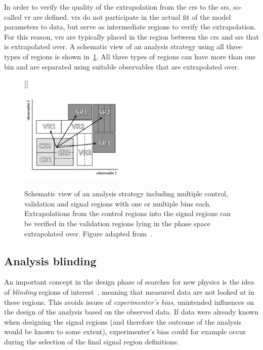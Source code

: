 In order to verify the quality of the extrapolation from the \glspl{cr} to the \glspl{sr}, so-called \gls{vr} are defined. \glspl{vr} do not participate in the actual fit of the model parameters to data, but serve as intermediate regions to verify the extrapolation. For this reason, \glspl{vr} are typically placed in the region between the \glspl{cr} and \glspl{sr} that is extrapolated over. A schematic view of an analysis strategy using all three types of regions is shown in~\cref{fig:hf_strategy}. All three types of regions can have more than one bin and are separated using suitable observables that are extrapolated over.


\begin{figure}
[\FBwidth]
{\caption{Schematic view of an analysis strategy including multiple control, validation and signal regions with one or multiple bins each. Extrapolations from the control regions into the signal regions can be verified in the validation regions lying in the phase space extrapolated over. Figure adapted from~\cite{HistFitter:2014wma}.}\label{fig:hf_strategy}}
{\includegraphics[width=0.45\textwidth]{hf_strategy}}
\end{figure}


\subsection{Analysis blinding}

An important concept in the design phase of searches for new physics is the idea of \textit{blinding} regions of interest~\cite{blind:2003rw}, meaning that measured data are not looked at in these regions. This avoids issues of \textit{experimenter's bias}, \ie unintended influences on the design of the analysis based on the observed data. If data were already known when designing the signal regions (and therefore the outcome of the analysis would be known to some extent), experimenter's bias could for example occur during the selection of the final signal region definitions.

